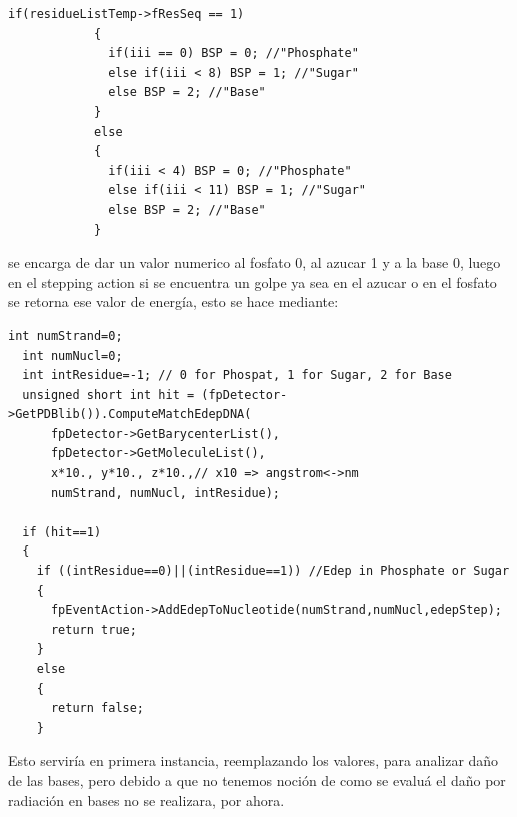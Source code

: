 \lstset {language=C++}
\begin{lstlisting}
if(residueListTemp->fResSeq == 1)
            {
              if(iii == 0) BSP = 0; //"Phosphate"
              else if(iii < 8) BSP = 1; //"Sugar"
              else BSP = 2; //"Base"
            }
            else
            {
              if(iii < 4) BSP = 0; //"Phosphate"
              else if(iii < 11) BSP = 1; //"Sugar"
              else BSP = 2; //"Base"
            }
\end{lstlisting}
se encarga de dar un valor numerico al fosfato 0, al azucar 1 y a la base 0, luego en el stepping action si se encuentra un golpe ya sea en el azucar o en el fosfato se retorna ese valor de energía, esto se hace mediante:
\lstset {language=C++}
\begin{lstlisting}
int numStrand=0;
  int numNucl=0;
  int intResidue=-1; // 0 for Phospat, 1 for Sugar, 2 for Base
  unsigned short int hit = (fpDetector->GetPDBlib()).ComputeMatchEdepDNA(
      fpDetector->GetBarycenterList(),
      fpDetector->GetMoleculeList(),
      x*10., y*10., z*10.,// x10 => angstrom<->nm
      numStrand, numNucl, intResidue);

  if (hit==1)
  {
    if ((intResidue==0)||(intResidue==1)) //Edep in Phosphate or Sugar
    {
      fpEventAction->AddEdepToNucleotide(numStrand,numNucl,edepStep);
      return true;
    }
    else
    {
      return false;
    }
    \end{lstlisting}

    Esto serviría en primera instancia, reemplazando los valores, para analizar daño de las bases, pero debido a que no tenemos noción de como se evaluá el daño por radiación en bases no se realizara, por ahora.

